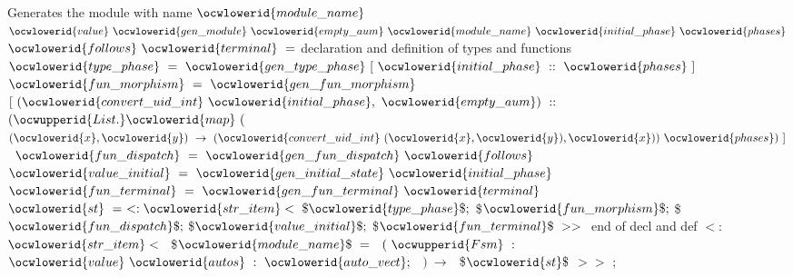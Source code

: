 \documentclass[12pt]{article}
\begin{document}
\ocwendcode{}\ocwindent{0.00em}
Generates the module with name \ocwbegindcode{}$\ocwlowerid{module\_name}$\ocwenddcode{} 
\ocweol
\label{../ML/regular.ml:23309}%
\medskip
\ocwbegincode{}\ocwindent{0.00em}
$\ocwlowerid{value}~\ocwlowerid{gen\_module}~\ocwlowerid{empty\_aum}~\ocwlowerid{module\_name}~\ocwlowerid{initial\_phase}~\ocwlowerid{phases}$\ocweol
\ocwindent{8.50em}
$\ocwlowerid{follows}~\ocwlowerid{terminal}~=$\ocweol
\ocwindent{1.00em}
\ocwbc{} declaration and definition of types and functions \ocwec{}\ocweol
\ocwindent{1.00em}
~$\ocwlowerid{type\_phase}~=~\ocwlowerid{gen\_type\_phase}~[~\ocwlowerid{initial\_phase}~::~\ocwlowerid{phases}~]$\ocweol
\ocwindent{1.00em}
~$\ocwlowerid{fun\_morphism}~=~\ocwlowerid{gen\_fun\_morphism}~$\ocweol
\ocwindent{2.00em}
$[~(\ocwlowerid{convert\_uid\_int}~\ocwlowerid{initial\_phase},~\ocwlowerid{empty\_aum})~::~$\ocweol
\ocwindent{4.00em}
$(\ocwupperid{List.}\ocwlowerid{map}~($~$(\ocwlowerid{x},\ocwlowerid{y})~\rightarrow{}~(\ocwlowerid{convert\_uid\_int}~(\ocwlowerid{x},\ocwlowerid{y}),\ocwlowerid{x}))~\ocwlowerid{phases})~]$\ocweol
\ocwindent{1.00em}
~$\ocwlowerid{fun\_dispatch}~=~\ocwlowerid{gen\_fun\_dispatch}~\ocwlowerid{follows}$\ocweol
\ocwindent{1.00em}
~$\ocwlowerid{value\_initial}~=~\ocwlowerid{gen\_initial\_state}~\ocwlowerid{initial\_phase}$\ocweol
\ocwindent{1.00em}
~$\ocwlowerid{fun\_terminal}~=~\ocwlowerid{gen\_fun\_terminal}~\ocwlowerid{terminal}~$~\ocweol
\ocwindent{1.00em}
~$\ocwlowerid{st}~=~\ensuremath{<}:\ocwlowerid{str\_item}<~\$\ocwlowerid{type\_phase}\$;$\ocweol
\ocwindent{11.50em}
\$$\ocwlowerid{fun\_morphism}\$;$\ocweol
\ocwindent{11.50em}
\$$\ocwlowerid{fun\_dispatch}\$;$\ocweol
\ocwindent{11.50em}
\$$\ocwlowerid{value\_initial}\$;$\ocweol
\ocwindent{11.50em}
\$$\ocwlowerid{fun\_terminal}\$~\ensuremath{>}\ensuremath{>}~$\ocweol
\ocwindent{1.00em}
\ocwbc{} end of decl and def \ocwec{}\ocweol
\ocwindent{1.00em}
\ensuremath{<}:$\ocwlowerid{str\_item}<~$~\$$\ocwlowerid{module\_name}\$~=$\ocweol
\ocwindent{3.00em}
~$(~\ocwupperid{Fsm}~:~$~$\ocwlowerid{value}~\ocwlowerid{autos}~:~\ocwlowerid{auto\_vect};~$~$)~\rightarrow{}~$~\$$\ocwlowerid{st}\$~$\ensuremath{>}\ensuremath{>}\ocweol
\ocwindent{0.00em}
;\medskip
\end{document}
